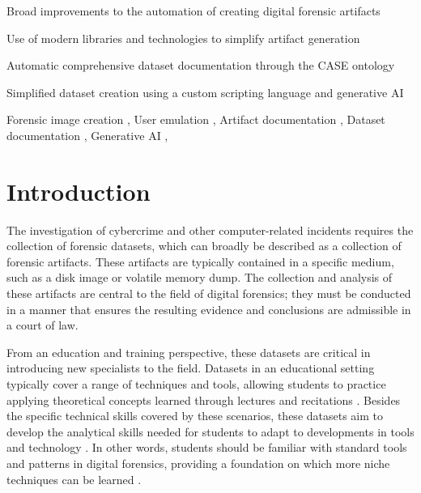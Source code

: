 \documentclass[final,5p,times,twocolumn]{elsarticle}
\begin{document}
\begin{frontmatter}
\begin{highlights}
\item Broad improvements to the automation of creating digital forensic artifacts
\item Use of modern libraries and technologies to simplify artifact generation
\item Automatic comprehensive dataset documentation through the CASE ontology
\item Simplified dataset creation using a custom scripting language and generative AI
\end{highlights}
    
\begin{keyword}
Forensic image creation \sep
User emulation \sep
Artifact documentation \sep
Dataset documentation \sep
Generative AI \sep
\end{keyword}

\end{frontmatter}

\section{Introduction}\label{introduction}

The investigation of cybercrime and other computer-related incidents
requires the collection of forensic datasets, which can broadly be
described as a collection of forensic artifacts. These artifacts are
typically contained in a specific medium, such as a disk image or
volatile memory dump. The collection and analysis of these artifacts are
central to the field of digital forensics; they must be conducted in a
manner that ensures the resulting evidence and conclusions are
admissible in a court of law.

From an education and training perspective, these datasets are critical
in introducing new specialists to the field. Datasets in an educational
setting typically cover a range of techniques and tools, allowing
students to practice applying theoretical concepts learned through
lectures and recitations
\cite{adelsteinAutomaticallyCreatingRealistic2005}. Besides the
specific technical skills covered by these scenarios, these datasets aim
to develop the analytical skills needed for students to adapt to
developments in tools and technology
\cite{cooperStandardsDigitalForensics2010}. In other words, students
should be familiar with standard tools and patterns in digital
forensics, providing a foundation on which more niche techniques can be
learned \cite{lawrenceFrameworkDesignWebbased2009}.
\end{document}
